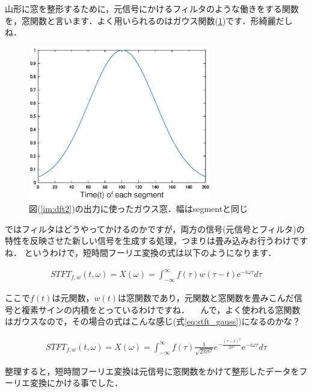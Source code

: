 \documentclass[11pt,a4paper]{ujreport} 	%
\begin{document}
山形に窓を整形するために，元信号にかけるフィルタのような働きをする関数を，窓関数と言います．よく用いられるのはガウス関数(\ref{im:gauss-window})です．形綺麗だしね．

\begin{figure}[H]
  \label{im:gauss-window}
  \centering
  \includegraphics[width=8cm]{../figures/gauss-window.eps}
  \caption{図(\ref{im:dft2})の出力に使ったガウス窓．幅はsegmentと同じ}
\end{figure}

ではフィルタはどうやってかけるのかですが，両方の信号(元信号とフィルタ)の特性を反映させた新しい信号を生成する処理，つまりは畳み込みお行うわけですね．
というわけで，短時間フーリエ変換の式は以下のようになります．

\begin{eqnarray}
STFT_{f,w}(t, \omega) =X(\omega)= \int_{-\infty}^{\infty} f(\tau)w(\tau - t)\mathrm{e}^{-i\omega \tau} d\tau
\label{eq:stft}
\end{eqnarray}

ここで$f(t)$は元関数，$w(t)$は窓関数であり，元関数と窓関数を畳みこんだ信号と複素サインの内積をとっているわけですね．
　んで，よく使われる窓関数はガウスなので，その場合の式はこんな感じ(式\ref{eq:stft_gauss})になるのかな？

\begin{eqnarray}
STFT_{f,w}(t, \omega) = X(\omega) = \int_{-\infty}^{\infty} f(\tau) \frac{1}{\sqrt{2\pi\sigma^2}}e^{-\frac{{(\tau-t)}^2}{2\sigma^2}}\mathrm{e}^{-i\omega \tau} d\tau
\label{eq:stft_gauss}
\end{eqnarray}

整理すると，短時間フーリエ変換は元信号に窓関数をかけて整形したデータをフーリエ変換にかける事でした．\\
\end{document}

